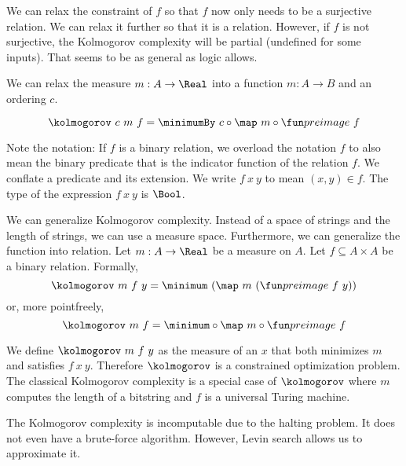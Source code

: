 We can relax the constraint of \(f\) so that \(f\)
now only needs to be a surjective relation.
We can relax it further so that it is a relation.
However, if \(f\) is not surjective,
the Kolmogorov complexity will be partial
(undefined for some inputs).
That seems to be as general as logic allows.

We can relax the measure \(m : A \to \Real\) into a function \(m : A \to B\)
and an ordering \(c\).

\[
    \kolmogorov~c~m~f = \minimumBy~c \circ \map~m \circ \preimage~f
\]

Note the notation:
If \(f\) is a binary relation,
we overload the notation \(f\)
to also mean the binary predicate
that is the indicator function of the relation \(f\).
We conflate a predicate and its extension.
We write \(f~x~y\) to mean \((x,y) \in f\).
The type of the expression \(f~x~y\) is \(\Bool\).

We can generalize Kolmogorov complexity.
Instead of a space of strings and the length of strings,
we can use a measure space.
Furthermore, we can generalize the function into relation.
Let \(m : A \to \Real\) be a measure on \(A\).
Let \(f \subseteq A \times A\) be a binary relation.
Formally,
\[
    \kolmogorov~m~f~y = \minimum~(\map~m~(\preimage~f~y))
\]
or, more pointfreely,
\begin{equation}
    \kolmogorov~m~f = \minimum \circ \map~m \circ \preimage~f
\end{equation}

We define \(\kolmogorov~m~f~y\) as the measure of an \(x\)
that both minimizes \(m\) and satisfies \(f~x~y\).
Therefore \(\kolmogorov\) is a constrained optimization problem.
The classical Kolmogorov complexity is a special case of \(\kolmogorov\)
where \(m\) computes the length of a bitstring
and \(f\) is a universal Turing machine.

The Kolmogorov complexity is incomputable due to the halting problem.
It does not even have a brute-force algorithm.
However, Levin search allows us to approximate it.
